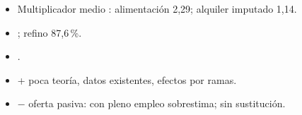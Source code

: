 \documentclass{article}
\begin{document}
\begin{columnas}
\begin{itemize}
\end{itemize}
\begin{itemize}
\item Multiplicador medio : alimentación 2,29; alquiler imputado 1,14.
\item {}; refino 87,6\,\%.
\item {}.
\end{itemize}
\begin{itemize}
\item + poca teoría, datos existentes, efectos por ramas.
\item $-$ oferta pasiva: con pleno empleo sobrestima; sin sustitución.
\end{itemize}


\end{columnas}
\end{document}

